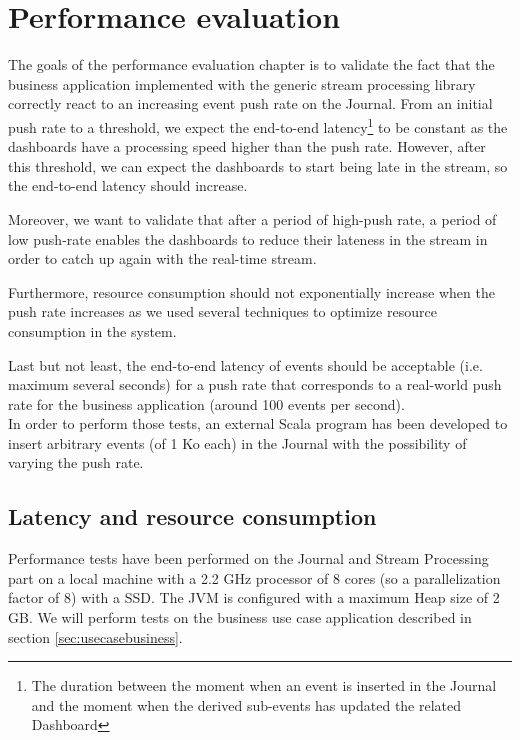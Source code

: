 \chapter{Performance evaluation}
\label{sec:perfeval}

The goals of the performance evaluation chapter is to validate the fact that the business application implemented with the generic stream processing library correctly react to an increasing event push rate on the Journal. From an initial push rate to a threshold, we expect the end-to-end latency\footnote{The duration between the moment when an event is inserted in the Journal and the moment when the derived sub-events has updated the related Dashboard} to be constant as the dashboards have a processing speed higher than the push rate. However, after this threshold, we can expect the dashboards to start being late in the stream, so the end-to-end latency should increase.

Moreover, we want to validate that after a period of high-push rate, a period of low push-rate enables the dashboards to reduce their lateness in the stream in order to catch up again with the real-time stream.

Furthermore, resource consumption should not exponentially increase when the push rate increases as we used several techniques to optimize resource consumption in the system.

Last but not least, the end-to-end latency of events should be acceptable (i.e. maximum several seconds) for a push rate that corresponds to a real-world push rate for the business application (around 100 events per second).
\\

In order to perform those tests, an external Scala program has been developed to insert arbitrary events (of 1 Ko each) in the Journal with the possibility of varying the push rate.


\section{Latency and resource consumption}

Performance tests have been performed on the Journal and Stream Processing part on a local machine with a 2.2 GHz processor of 8 cores (so a parallelization factor of 8) with a SSD. The JVM is configured with a maximum Heap size of 2 GB. We will perform tests on the business use case application described in section \ref{sec:usecasebusiness}.
\\

